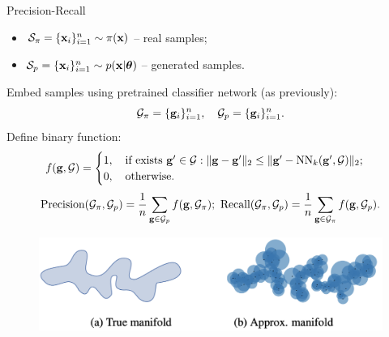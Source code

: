 \begin{frame}{Precision-Recall}
	\begin{itemize}
		\item $\mathcal{S}_{\pi} = \{\mathbf{x}_i\}_{i=1}^{n} \sim \pi(\mathbf{x})$ -- real samples;
		\item $\mathcal{S}_{p} = \{\mathbf{x}_i\}_{i=1}^{n} \sim p(\mathbf{x} | \boldsymbol{\theta})$ -- generated samples.
	\end{itemize}
	Embed samples using pretrained classifier network (as previously):
	\[
		\mathcal{G}_{\pi} = \{\mathbf{g}_i\}_{i=1}^n, \quad \mathcal{G}_{p} = \{\mathbf{g}_i\}_{i=1}^n.
	\]
	Define binary function:
	\[
		f(\mathbf{g}, \mathcal{G}) = 
		\begin{cases}
			1, \quad \text{if exists } \mathbf{g}' \in \mathcal{G}: \| \mathbf{g}  - \mathbf{g}'\|_2 \leq \| \mathbf{g}' - \text{NN}_k(\mathbf{g}', \mathcal{G})\|_2; \\
			0, \quad \text{otherwise.}
		\end{cases}
	\]
	\[
		\text{Precision} (\mathcal{G}_{\pi}, \mathcal{G}_{p}) = \frac{1}{n} \sum_{\mathbf{g} \in \mathcal{G}_{p}} f(\mathbf{g}, \mathcal{G}_{\pi}); \,\, \text{Recall} (\mathcal{G}_{\pi}, \mathcal{G}_{p}) = \frac{1}{n} \sum_{\mathbf{g} \in \mathcal{G}_{\pi}} f(\mathbf{g}, \mathcal{G}_{p}).
	\]
	\vspace{-0.4cm}
	\begin{figure}
		\includegraphics[width=0.7\linewidth]{figs/pr_k_nearest}
	\end{figure}
\end{frame}
